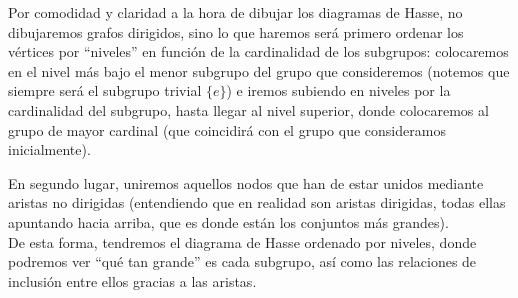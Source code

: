 \begin{notacion}
    Por comodidad y claridad a la hora de dibujar los diagramas de Hasse, no dibujaremos grafos dirigidos, sino lo que haremos será primero ordenar los vértices por ``niveles'' en función de la cardinalidad de los subgrupos: colocaremos en el nivel más bajo el menor subgrupo del grupo que consideremos (notemos que siempre será el subgrupo trivial $\{e\}$) e iremos subiendo en niveles por la cardinalidad del subgrupo, hasta llegar al nivel superior, donde colocaremos al grupo de mayor cardinal (que coincidirá con el grupo que consideramos inicialmente).

    En segundo lugar, uniremos aquellos nodos que han de estar unidos mediante aristas no dirigidas (entendiendo que en realidad son aristas dirigidas, todas ellas apuntando hacia arriba, que es donde están los conjuntos más grandes).\\

    De esta forma, tendremos el diagrama de Hasse ordenado por niveles, donde podremos ver ``qué tan grande'' es cada subgrupo, así como las relaciones de inclusión entre ellos gracias a las aristas.
\end{notacion}

